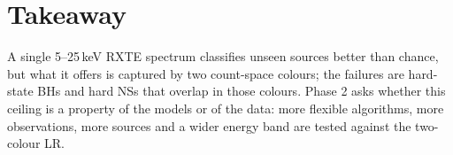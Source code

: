 \section{Takeaway}
A single 5--25\,keV RXTE spectrum classifies unseen sources better than chance, but what it offers is captured by two
count-space colours; the failures are hard-state BHs and hard NSs that overlap in those colours. Phase 2 asks whether this
ceiling is a property of the models or of the data: more flexible algorithms, more observations, more sources and a wider
energy band are tested against the two-colour LR.
